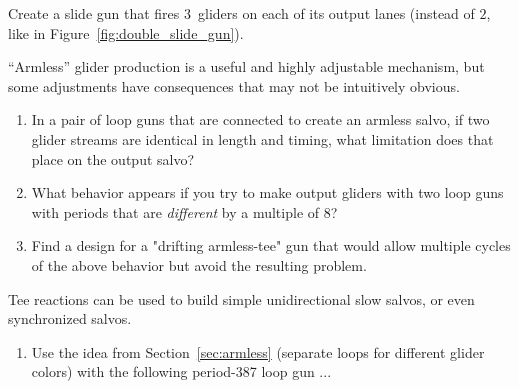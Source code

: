 \begin{multicols}{2}
	
	\begin{problem}\label{exer:triple_slide_gun}
		Create a slide gun that fires $3$~gliders on each of its output lanes (instead of $2$, like in Figure~\ref{fig:double_slide_gun}).
		
	\end{problem}
	
	
	\mfilbreak
	
	
	\begin{problem}\label{exer:armless_basics}
		``Armless'' glider production is a useful and highly adjustable mechanism, but some adjustments have consequences that may not be intuitively obvious.
		\begin{enumerate}[label=\bf\color{ocre}(\alph*)]
			\item In a pair of loop guns that are connected to create an armless salvo, if two glider streams are identical in length and timing, what limitation does that place on the output salvo?
			\item What behavior appears if you try to make output gliders with two loop guns with periods that are \emph{different} by a multiple of 8?
			\item Find a design for a "drifting armless-tee" gun that would allow multiple cycles of the above behavior but avoid the resulting problem.
		\end{enumerate}
	\end{problem}
	
	
	\mfilbreak
	
	
	\begin{problem}\label{exer:armless_tee}
		Tee reactions can be used to build simple unidirectional slow salvos, or even synchronized salvos.
		\begin{enumerate}[label=\bf\color{ocre}(\alph*)]
			\item Use the idea from Section~\ref{sec:armless} (separate loops for different glider colors) with the following period-387 loop gun ...
			

\end{enumerate}
\end{problem}
\end{multicols}
